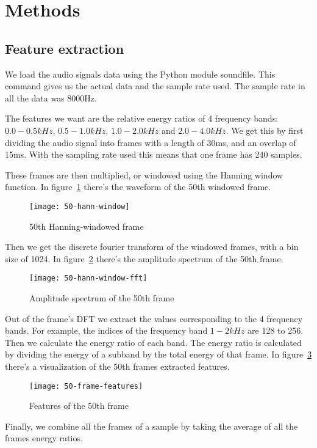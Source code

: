 \section{Methods}

\subsection{Feature extraction}
We load the audio signals data using the Python module soundfile. This command
gives us the actual data and the sample rate used. The sample rate in all the
data was 8000Hz.

The features we want are the relative energy ratios of 4 frequency bands:
\(0.0 - 0.5 kHz\), \(0.5 - 1.0 kHz\), \(1.0 - 2.0 kHz\) and \(2.0 - 4.0 kHz\).
We get this by first dividing the audio signal into frames with a length of
30ms, and an overlap of 15ms. With the sampling rate used this means that one
frame has 240 samples.

These frames are then multiplied, or windowed using the Hanning window
function. In figure~\ref{fig:hann50} there's the waveform of the 50th windowed
frame.
\begin{figure}[H]
  \centering
  \texttt{[image: 50-hann-window]}
  \caption{50th Hanning-windowed frame}
\label{fig:hann50}
\end{figure}

Then we get the discrete fourier transform of the windowed frames,
with a bin size of 1024. In figure~\ref{fig:amp_spec} there's the amplitude
spectrum of the 50th frame.
\begin{figure}[H]
  \centering
  \texttt{[image: 50-hann-window-fft]}
  \caption{Amplitude spectrum of the 50th frame}
\label{fig:amp_spec}
\end{figure}

Out of the frame's DFT we extract the values corresponding to the 4 frequency
bands. For example, the indices of the frequency band \(1-2 kHz\) are 128 to
256. Then we calculate the energy ratio of each band. The energy ratio is
calculated by dividing the energy of a subband by the total energy of that
frame. In figure~\ref{fig:features} there's a visualization of the 50th frames
extracted features.
\begin{figure}[H]
  \centering
  \texttt{[image: 50-frame-features]}
  \caption{Features of the 50th frame}
\label{fig:features}
\end{figure}
Finally, we combine all the frames of a sample by taking the average of all the
frames energy ratios.


